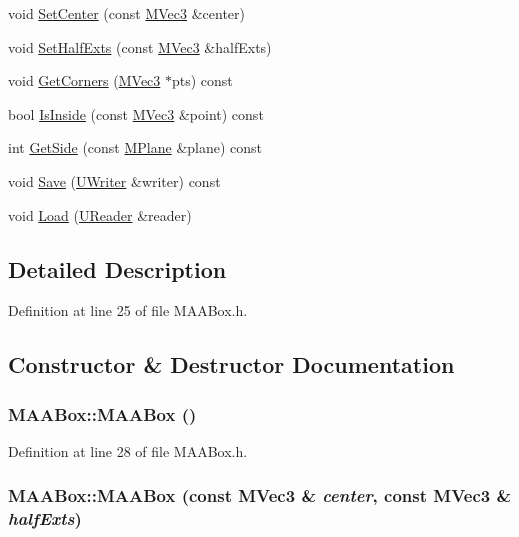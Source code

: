 \begin{CompactItemize}
\item 
void \hyperlink{class_m_a_a_box_65a37e6adae9f465bb0ac964f4bfbe63}{SetCenter} (const \hyperlink{class_m_vec3}{MVec3} \&center)
\item 
void \hyperlink{class_m_a_a_box_9ce3a23bc3cfa705d6776807289bd178}{SetHalfExts} (const \hyperlink{class_m_vec3}{MVec3} \&halfExts)
\item 
void \hyperlink{class_m_a_a_box_1880d28cd10db452fd1ef1d9d74774c9}{GetCorners} (\hyperlink{class_m_vec3}{MVec3} $\ast$pts) const 
\item 
bool \hyperlink{class_m_a_a_box_0531f288d3c7a6d0a2c9f90cf72a6668}{IsInside} (const \hyperlink{class_m_vec3}{MVec3} \&point) const 
\item 
int \hyperlink{class_m_a_a_box_0948818103883ba996a23c8e26f8a2a5}{GetSide} (const \hyperlink{class_m_plane}{MPlane} \&plane) const 
\item 
void \hyperlink{class_m_a_a_box_c24b0c3002a56fd52de6628e1864e485}{Save} (\hyperlink{class_u_writer}{UWriter} \&writer) const 
\item 
void \hyperlink{class_m_a_a_box_7658fd191ee1fbbf3d6f93d0221fe13a}{Load} (\hyperlink{class_u_reader}{UReader} \&reader)
\end{CompactItemize}


\subsection{Detailed Description}


Definition at line 25 of file MAABox.h.

\subsection{Constructor \& Destructor Documentation}
\hypertarget{class_m_a_a_box_d357f82540e29376c81850a165dfd3d6}{
\subsubsection[{MAABox}]{\setlength{\rightskip}{0pt plus 5cm}MAABox::MAABox ()}}
\label{class_m_a_a_box_d357f82540e29376c81850a165dfd3d6}




Definition at line 28 of file MAABox.h.\hypertarget{class_m_a_a_box_870aa2351735fc8f49ec780d7fca8aec}{
\subsubsection[{MAABox}]{\setlength{\rightskip}{0pt plus 5cm}MAABox::MAABox (const {\bf MVec3} \& {\em center}, \/  const {\bf MVec3} \& {\em halfExts})}}
\label{class_m_a_a_box_870aa2351735fc8f49ec780d7fca8aec}




